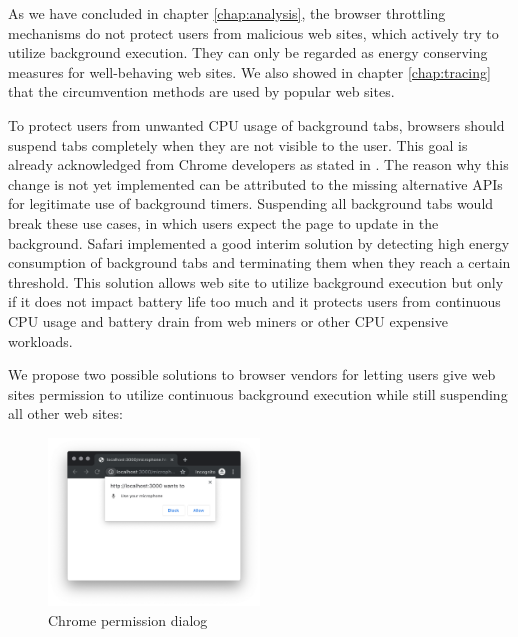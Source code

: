 \documentclass[
	ruledheaders=section,%
	class=report,%
	thesis={type=bachelor},%
	accentcolor=9c,%
	custommargins=true,%
	marginpar=false,%
	parskip=half-,%
	fontsize=11pt,%
]{tudapub}
\begin{document}
  As we have concluded in chapter \ref{chap:analysis}, the browser throttling mechanisms do not protect users from malicious web sites, which actively try to utilize background execution. They can only be regarded as energy conserving measures for well-behaving web sites. We also showed in chapter \ref{chap:tracing} that the circumvention methods are used by popular web sites.

  To protect users from unwanted CPU usage of background tabs, browsers should suspend tabs completely when they are not visible to the user. This goal is already acknowledged from Chrome developers as stated in \cite{chrome-background-tabs-roadmap}. The reason why this change is not yet implemented can be attributed to the missing alternative APIs for legitimate use of background timers. Suspending all background tabs would break these use cases, in which users expect the page to update in the background. Safari implemented a good interim solution by detecting high energy consumption of background tabs and terminating them when they reach a certain threshold. This solution allows web site to utilize background execution but only if it does not impact battery life too much and it protects users from continuous CPU usage and battery drain from web miners or other CPU expensive workloads.

  We propose two possible solutions to browser vendors for letting users give web sites permission to utilize continuous background execution while still suspending all other web sites:

  \begin{figure}
    \centering
    \includegraphics[width=0.5\textwidth]{images/microphone-permission.png}
    \caption{Chrome permission dialog}
    \label{fig:chrome-permission-dialog}
  \end{figure}
\end{document}
